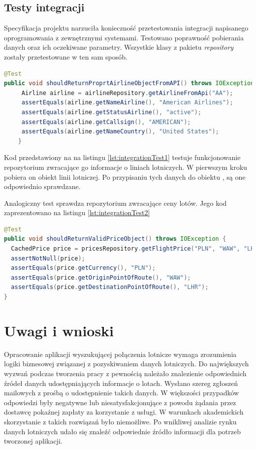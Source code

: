 \documentclass[12pt, twoside]{report}
\begin{document}
\section{Testy integracji}
Specyfikacja projektu narzuciła konieczność przetestowania integracji napisanego oprogramowania z zewnętrznymi systemami. Testowano poprawność pobierania danych oraz ich oczekiwane parametry. Wszystkie klasy z pakietu \textit{repository} zostały przetestowane w ten sam sposób.
\begin{lstlisting}[language=java, caption=Przykładowy test integracyjny, label=lst:integrationTest1]
@Test
public void shouldReturnProprtAirlineObjectFromAPI() throws IOException {
     Airline airline = airlineRepository.getAirlineFromApi("AA");
     assertEquals(airline.getNameAirline(), "American Airlines");
     assertEquals(airline.getStatusAirline(), "active");
     assertEquals(airline.getCallsign(), "AMERICAN");
     assertEquals(airline.getNameCountry(), "United States");
    }
\end{lstlisting}
Kod przedstawiony na na listingu \ref{lst:integrationTest1} testuje funkcjonowanie repozytorium zwracające go informacje o liniach lotniczych. W pierwszym kroku pobiera on obiekt linii lotniczej. Po przypisaniu tych danych do obiektu , są one odpowiednio sprawdzane.

Analogiczny test sprawdza repozytorium zwracające ceny lotów. Jego kod zaprezentowano na listingu \ref{lst:integrationTest2}
\begin{lstlisting}[language=java, caption=Przykładowy test integracyjny, label=lst:integrationTest2]
@Test
public void shouldReturnValidPriceObject() throws IOException {
  CachedPrice price = pricesRepository.getFlightPrice("PLN", "WAW", "LHR", "20190128", "20190130");
  assertNotNull(price);
  assertEquals(price.getCurrency(), "PLN");
  assertEquals(price.getOriginPointOfRoute(), "WAW");
  assertEquals(price.getDestinationPointOfRoute(), "LHR");
}
\end{lstlisting}


\chapter{Uwagi i wnioski}
Opracowanie aplikacji wyszukującej połączenia lotnicze wymaga zrozumienia logiki biznesowej związanej z pozyskiwaniem danych lotniczych. Do największych wyzwań podczas tworzenia pracy z pewnością należało znalezienie odpowiednich źródeł danych udostępniających informacje o lotach. Wysłano szereg zgłoszeń mailowych z prośbą o udostępnienie takich danych. W większości przypadków odpowiedzi były negatywne lub niesatysfakcjonujące z powodu żądania przez dostawcę pokaźnej zapłaty za korzystanie z usługi. W warunkach akademickich skorzystanie z takich rozwiązań było niemożliwe. Po wnikliwej analizie rynku danych lotniczych udało się znaleźć odpowiednie źródło informacji dla potrzeb tworzonej aplikacji.
\end{document}
